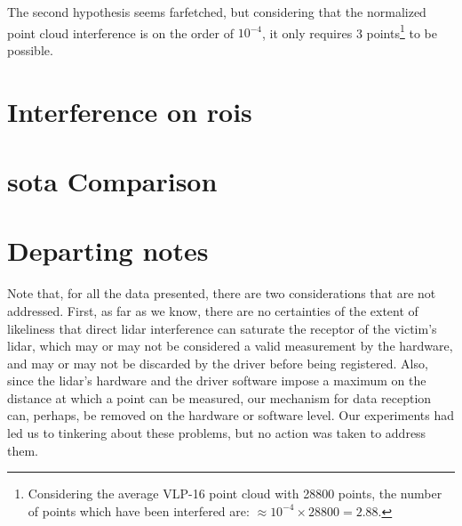 The second hypothesis seems farfetched, but considering that the normalized point cloud interference is on the order of $10^{-4}$, it only requires 3 points\footnote{Considering the average VLP-16 point cloud with 28800 points, the number of points which have been interfered are: $\approx 10^{-4} \times 28800 = 2.88$.} to be possible.

\section{Interference on \acp{roi}}

\section{\acl{sota} Comparison}

\section{Departing notes}
Note that, for all the data presented, there are two considerations that are not addressed. First, as far as we know, there are no certainties of the extent of likeliness that direct \ac{lidar} interference can saturate the receptor of the victim's \ac{lidar}, which may or may not be considered a valid measurement by the hardware, and may or may not be discarded by the driver before being registered. Also, since the \ac{lidar}'s hardware and the driver software impose a maximum on the distance at which a point can be measured, our mechanism for data reception can, perhaps, be removed on the hardware or software level. Our experiments had led us to tinkering about these problems, but no action was taken to address them.
